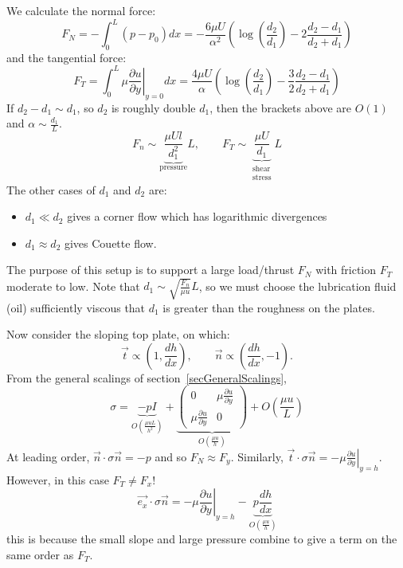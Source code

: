 \documentclass[../Main.tex]{subfiles}
\begin{document}
We calculate the normal force:
\begin{equation*}
    F_N = -\int_{0}^{L} (p - p_0) dx = -\frac{6\mu U}{\alpha^2} \left(\log\left(\frac{d_2}{d_1}\right) - 2 \frac{d_2 - d_1}{d_2 + d_1}\right)
\end{equation*}
and the tangential force:
\begin{equation*}
    F_T = \int_{0}^{L} \mu \left.\frac{\partial u}{\partial y}\right|_{y = 0} dx = \frac{4\mu U}{\alpha} \left(\log \left(\frac{d_2}{d_1}\right) - \frac32 \frac{d_2 - d_1}{d_2 + d_1}\right)
\end{equation*}
If $d_2 - d_1 \sim d_1$, so $d_2$ is roughly double $d_1$, then the brackets above are $O(1)$ and $\alpha \sim \frac{d_1}{L}$.
\begin{equation*}
    F_n \sim \underbrace{\frac{\mu U l}{d_1^2}}_{\text{pressure}} L,\qquad F_T \sim \underbrace{\frac{\mu U}{d_1}}_{\substack{\text{shear}\\\text{stress}}}L
\end{equation*}
The other cases of $d_1$ and $d_2$ are:
\begin{itemize}
    \item $d_1 \ll d_2$ gives a corner flow which has logarithmic divergences %
    \item $d_1 \approx d_2$ gives Couette flow.
\end{itemize}

The purpose of this setup is to support a large load/thrust $F_N$ with friction $F_T$ moderate to low. Note that $d_1 \sim \sqrt{\frac{F_n}{\mu u}}L$, so we must choose the lubrication fluid (oil) sufficiently viscous that $d_1$ is greater than the roughness on the plates. %

Now consider the sloping top plate, on which:
\begin{equation*}
    \vec{t} \propto \left(1, \frac{dh}{dx}\right),\qquad \vec{n} \propto \left(\frac{dh}{dx}, -1\right).
\end{equation*}
From the general scalings of section~\ref{secGeneralScalings},
\begin{equation*}
    \sigma = \underbrace{-pI}_{O\left(\frac{\mu u L}{h^2}\right)} +
    \underbrace{\begin{pmatrix}
        0 & \mu \frac{\partial u}{\partial y} \\
        \mu \frac{\partial u}{\partial y} & 0
    \end{pmatrix}}_{O\left(\frac{\mu u}{h}\right)} + O\left(\frac{\mu u}{L}\right)
\end{equation*}
At leading order, $\vec n \cdot \sigma\vec n = -p$ and so $F_N \approx F_y$. Similarly, $\vec t \cdot \sigma\vec n = -\mu \left.\frac{\partial u}{\partial y}\right|_{y = h}$. However, in this case $F_T \neq F_x$!
\begin{equation*}
    \vec{e_x} \cdot \sigma \vec{n} = -\mu \left.\frac{\partial u}{\partial y}\right|_{y = h} - \underbrace{p \frac{dh}{dx}}_{O\left(\frac{\mu u}{h}\right)}
\end{equation*}
this is because the small slope and large pressure combine to give a term on the same order as $F_T$.
\end{document}
